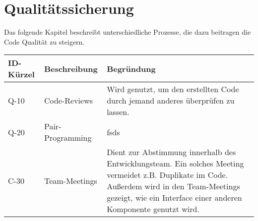 
\chapter{Qualitätssicherung}
Das folgende Kapitel beschreibt unterschiedliche Prozesse, die dazu beitragen die Code Qualität zu steigern. 





\begin{tabularx}{\textwidth}{|l|X|X|}
    \toprule
    \textbf{ID-Kürzel} & \textbf{Beschreibung} & \textbf{Begründung}\\
    \midrule
    \endhead
    \hline
    \caption{Code Conventions}
    
    \endfoot
    
    Q-10 & Code-Reviews & Wird genutzt, um den erstellten Code durch jemand anderes überprüfen zu lassen. \\ \hline
    Q-20 & Pair-Programming &  fsds\\ \hline
    C-30 & Team-Meetings & Dient zur Abstimmung innerhalb des Entwicklungsteam. Ein solches Meeting vermeidet z.B. Duplikate im Code. Außerdem wird in den Team-Meetings gezeigt, wie ein Interface einer anderen Komponente genutzt wird.\\
	
 
  
\end{tabularx}